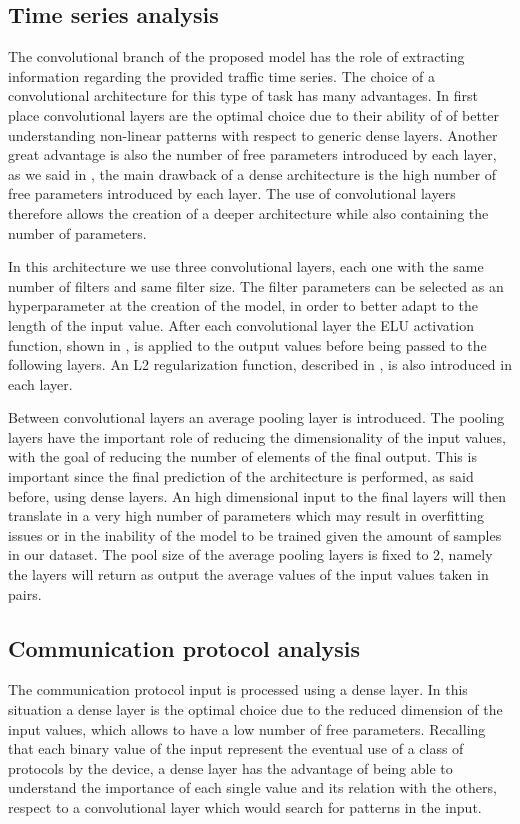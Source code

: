 \subsection{Time series analysis}

The convolutional branch of the proposed model has the role of extracting information regarding the provided traffic time series. The choice of a convolutional architecture for this type of task has many advantages. In first place convolutional layers are the optimal choice due to their ability of of better understanding non-linear patterns with respect to generic dense layers. Another great advantage is also the number of free parameters introduced by each layer, as we said in , the main drawback of a dense architecture is the high number of free parameters introduced by each layer. The use of convolutional layers therefore allows the creation of a deeper architecture while also containing the number of parameters.

In this architecture we use three convolutional layers, each one with the same number of filters and same filter size. The filter parameters can be selected as an hyperparameter at the creation of the model, in order to better adapt to the length of the input value. After each convolutional layer the ELU activation function, shown in , is applied to the output values before being passed to the following layers. An L2 regularization function, described in , is also introduced in each layer.

Between convolutional layers an average pooling layer is introduced. The pooling layers have the important role of reducing the dimensionality of the input values, with the goal of reducing the number of elements of the final output. This is important since the final prediction of the architecture is performed, as said before, using dense layers. An high dimensional input to the final layers will then translate in a very high number of parameters which may result in overfitting issues or in the inability of the model to be trained given the amount of samples in our dataset. The pool size of the average pooling layers is fixed to 2, namely the layers will return as output the average values of the input values taken in pairs.

\subsection{Communication protocol analysis}
The communication protocol input is processed using a dense layer. In this situation a dense layer is the optimal choice due to the reduced dimension of the input values, which allows to have a low number of free parameters. Recalling that each binary value of the input represent the eventual use of a class of protocols by the device, a dense layer has the advantage of being able to understand the importance of each single value and its relation with the others, respect to a convolutional layer which would search for patterns in the input.

